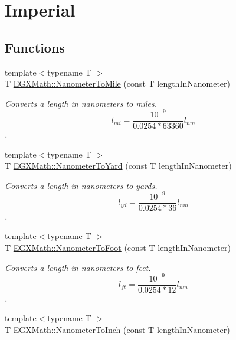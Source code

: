 \hypertarget{group___e_g_x_math-_conversions-_length_conversions-_s_i-_nanometer-_imperial}{}\section{Imperial}
\label{group___e_g_x_math-_conversions-_length_conversions-_s_i-_nanometer-_imperial}
\subsection*{Functions}
\begin{DoxyCompactItemize}
\item 
{\footnotesize template$<$typename T $>$ }\\T \mbox{\hyperlink{group___e_g_x_math-_conversions-_length_conversions-_s_i-_nanometer-_imperial_gadbf1e269e14b8afcd128aa5534f28a5e}{E\+G\+X\+Math\+::\+Nanometer\+To\+Mile}} (const T length\+In\+Nanometer)
\begin{DoxyCompactList}\small\item\em Converts a length in nanometers to miles. \[ l_{mi}=\frac{10^{-9}}{0.0254 * 63360} l_{nm} \]. \end{DoxyCompactList}\item 
{\footnotesize template$<$typename T $>$ }\\T \mbox{\hyperlink{group___e_g_x_math-_conversions-_length_conversions-_s_i-_nanometer-_imperial_ga1f2313a0bf1527690778a6dace0db853}{E\+G\+X\+Math\+::\+Nanometer\+To\+Yard}} (const T length\+In\+Nanometer)
\begin{DoxyCompactList}\small\item\em Converts a length in nanometers to yards. \[ l_{yd}= \frac{10^{-9}}{0.0254 * 36} l_{nm} \]. \end{DoxyCompactList}\item 
{\footnotesize template$<$typename T $>$ }\\T \mbox{\hyperlink{group___e_g_x_math-_conversions-_length_conversions-_s_i-_nanometer-_imperial_ga7c6124e07aa11d37695c96c5a520197d}{E\+G\+X\+Math\+::\+Nanometer\+To\+Foot}} (const T length\+In\+Nanometer)
\begin{DoxyCompactList}\small\item\em Converts a length in nanometers to feet. \[ l_{ft}= \frac{10^{-9}}{0.0254 * 12} l_{nm} \]. \end{DoxyCompactList}\item 
{\footnotesize template$<$typename T $>$ }\\T \mbox{\hyperlink{group___e_g_x_math-_conversions-_length_conversions-_s_i-_nanometer-_imperial_ga8b72dde5616da5be31e8054f1facc501}{E\+G\+X\+Math\+::\+Nanometer\+To\+Inch}} (const T length\+In\+Nanometer)

\end{DoxyCompactItemize}
